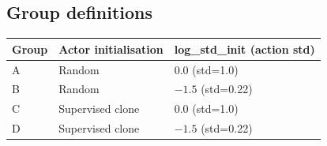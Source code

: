 
\subsection*{Group definitions}
\begin{table}[h]
\centering
\begin{tabular}{lll}
\hline
Group & Actor initialisation & log\_std\_init (action std) \\
\hline
A & Random & 0.0 (std=1.0) \\
B & Random & $-1.5$ (std=0.22) \\
C & Supervised clone & 0.0 (std=1.0) \\
D & Supervised clone & $-1.5$ (std=0.22) \\
\hline
\end{tabular}
\end{table}

